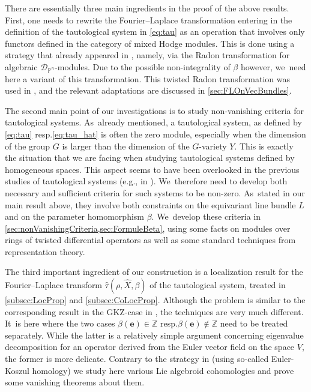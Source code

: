 \documentclass[11pt]{article}
\newcommand{\eg}{e.g.,\xspace}
\newcommand{\resp}{resp.\xspace}
\let\mathds\mathbb
\newcommand{\bme}{{\boldsymbol{e}}}
\newcommand{\dZ}{{\mathds Z}}\let\mbz\dZ\let\Z\dZ
\newcommand{\dP}{{\mathds P}}\let\P\dP
\begin{document}
There are essentially three main ingredients in the proof of the above results. First, one needs to rewrite the
Fourier--Laplace transformation entering in the definition of the tautological system in \eqref{eq:tau} as an operation that involves only functors defined in the category of mixed Hodge modules. This is done using a strategy that already appeared in \cite{Reich2}, namely, via the Radon transformation for algebraic $\mathscr{D}_{\dP^n}$\nobreakdash-mod\-ules.
Due to the possible non-integrality of $\beta$ however, we~need here a variant of this transformation.
This twisted Radon transformation was used in \cite[\S 5.2]{RS20}, and the relevant adaptations are discussed in \cref{sec:FLOnVecBundles}.

The second main point of our investigations is to study non-vanishing criteria for tautological systems. As~already mentioned, a tautological system, as defined by \eqref{eq:tau} \resp \eqref{eq:tau_hat} is often the zero module, especially when the dimension of the group $G$ is larger than the dimension of the $G$-variety $Y$. This is exactly the situation that we are facing when studying tautological systems defined by homogeneous spaces. This aspect seems to have been overlooked in the previous studies of tautological systems (\eg in \cite{Bloch_HolRankProb,HuangLianZhu}). We~therefore need to develop both necessary and sufficient criteria for such systems to be non-zero. As~stated in our main result above, they involve both constraints on the equivariant line bundle $L$ and on the parameter homomorphism $\beta$. We~develop these criteria in \cref{sec:nonVanishingCriteria,sec:FormuleBeta}, using some facts on modules over rings of twisted differential operators as well as some standard techniques from representation theory.

The third important ingredient of our construction is a localization result for the Fourier--Laplace transform $\hat{\tau}(\rho,\hat{X},\beta)$ of the tautological system, treated in \cref{subsec:LocProp} and \cref{subsec:CoLocProp}. Although the problem is similar to the corresponding result in the GKZ-case in \cite{SW09}, the techniques are very much different. It~is here where the two cases
$\beta(\bme)\in\dZ$ \resp $\beta(\bme)\notin\dZ$
need to be treated separately. While the latter is a relatively simple argument concerning eigenvalue decomposition for an operator derived from the Euler vector field on the space $V$, the former is more delicate. Contrary to the strategy in \cite{SW09} (using so-called Euler-Koszul homology) we study here various Lie algebroid cohomologies and prove some vanishing theorems about them.
\end{document}
